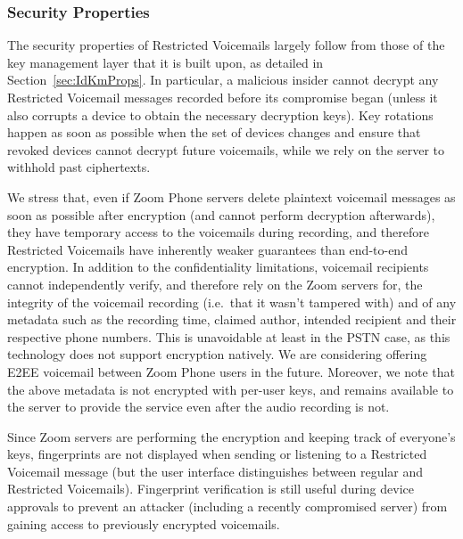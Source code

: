 \subsubsection{Security Properties}
The security properties of Restricted Voicemails largely follow from those of the key management layer that it is
built upon, as detailed in Section~\ref{sec:IdKmProps}. In particular, a malicious insider cannot
decrypt any Restricted Voicemail messages recorded before its compromise began (unless it also
corrupts a device to obtain the necessary decryption keys). Key rotations happen as soon as possible
when the set of devices changes and ensure that revoked devices cannot decrypt future voicemails,
while we rely on the server to withhold past ciphertexts.

We stress that, even if Zoom Phone servers delete plaintext voicemail messages as soon as possible
after encryption (and cannot perform decryption afterwards), they have temporary access to the
voicemails during recording, and therefore Restricted Voicemails have inherently weaker guarantees than end-to-end
encryption. In addition to the confidentiality limitations, voicemail recipients cannot
independently verify, and therefore rely on the Zoom servers for, the integrity of the voicemail
recording (i.e.\ that it wasn't tampered with) and of any metadata such as the recording time,
claimed author, intended recipient and their respective phone numbers. This is unavoidable at least
in the PSTN case, as this technology does not support encryption natively. We are considering
offering E2EE voicemail between Zoom Phone users in the future. Moreover, we note that the above
metadata is not encrypted with per-user keys, and remains available to the server to provide the
service even after the audio recording is not.

Since Zoom servers are performing the encryption and keeping track of everyone's keys, fingerprints
are not displayed when sending or listening to a Restricted Voicemail message (but the user interface
distinguishes between regular and Restricted Voicemails). Fingerprint verification is still
useful during device approvals to prevent an attacker (including a recently compromised server) from
gaining access to previously encrypted voicemails.
